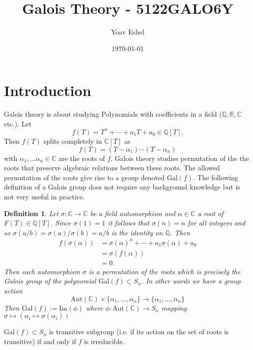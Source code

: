 \documentclass{article}
\title{Galois Theory - 5122GALO6Y}
\author{Yoav Eshel}
\date{\today}
\newcommand{\R}{\mathbb{R}}
\newcommand{\C}{\mathbb{C}}
\newcommand{\Q}{\mathbb{Q}}
\newtheorem*{definition}{Definition}
\theoremstyle{remark}
\begin{document}
    \maketitle
    \tableofcontents
    \newpage
    \section{Introduction}
    Galois theory is about studying Polynomials with coefficients in a field ($\Q,\R,\C$ etc.).
    Let
    $$
        f(T) = T^n+\cdots+a_1T+a_0\in\Q[T].
    $$
    Then $f(T)$ splits completely in $\C[T]$ as
    $$
        f(T)=(T-\alpha_1)\cdots(T-\alpha_n)
    $$
    with $\alpha_1,\dots \alpha_n\in\C$ are the roots of $f$. Galois theory studies permutation of the the roots that preserve algebraic relations between these roots.
    The allowed permutation of the roots give rise to a group denoted $\text{Gal}(f)$.
    The following definition of a Galois group does not require any background knowledge but is not very useful in practice.

    \begin{definition}
        Let $\sigma:\C\to\C$ be a field automorphism and $\alpha\in\C$ a root of $F(T)\in\Q[T]$. Since $\sigma(1)=1$ it follows that $\sigma(n)=n$ for all integers and so $\sigma(a/b)=\sigma(a)/\sigma(b)=a/b$ is the identity on $\Q$.
        Then
        \begin{align*}
            f(\sigma(\alpha))&=\sigma(\alpha)^n+\cdots+a_1\sigma(\alpha)+a_0\\
            &=\sigma(f(\alpha))\\
            &=0.
        \end{align*}
        Then each automorphism $\sigma$ is a permutation of the roots which is precisely the Galois group of the polynomial $\text{Gal}(f)\subset S_n$.
        In other words we have a group action 
        $$
        \text{Aut}(\C)\times\{\alpha_1,\dots,\alpha_n\}\to\{\alpha_1,\dots,\alpha_n\}
        $$
        Then $\text{Gal}(f):=\text{Im}(\phi)$ where $\phi:\text{Aut}(\C)\to S_n$ mapping $\sigma\mapsto(\alpha_i\mapsto \sigma(\alpha_i))$
    \end{definition}

    $\text{Gal}(f)\subset S_n$ is transitive subgroup (i.e. if its action on the set of roots is transitive) if and only if $f$ is irreducible.
    
\end{document}
